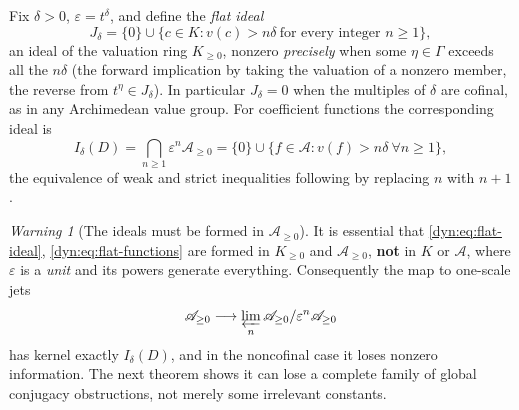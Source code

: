 \documentclass[11pt,letterpaper]{article}
\theoremstyle{definition}
\theoremstyle{remark}
\newtheorem{warning}[warning]{Warning}
\newcommand{\AAA}{\mathscr A}
\newcommand{\eps}{\varepsilon}
\numberwithin{equation}{section}
\begin{document}
Fix $\delta>0$, $\eps=t^{\delta}$, and define the \emph{flat ideal}
\begin{equation}\label{dyn:eq:flat-ideal}
 J_\delta=\{0\}\cup\{c\in K:v(c)>n\delta\ \text{for every integer }n\ge1\},
\end{equation}
an ideal of the valuation ring $K_{\ge0}$, nonzero \emph{precisely} when
some $\eta\in\Gamma$ exceeds all the $n\delta$ (the forward implication by
taking the valuation of a nonzero member, the reverse from
$t^{\eta}\in J_\delta$). In particular $J_\delta=0$ when the multiples of
$\delta$ are cofinal, as in any Archimedean value group. For coefficient
functions the corresponding ideal is
\begin{equation}\label{dyn:eq:flat-functions}
 I_\delta(D)=\bigcap_{n\ge1}\eps^{n}\AAA_{\ge0}
 =\{0\}\cup\{f\in\AAA:v(f)>n\delta\ \forall n\ge1\},
\end{equation}
the equivalence of weak and strict inequalities following by replacing $n$
with $n+1$.

\begin{warning}[The ideals must be formed in $\AAA_{\ge0}$]
\label{dyn:warn:flatideal}
It is essential that \eqref{dyn:eq:flat-ideal},
\eqref{dyn:eq:flat-functions} are formed in $K_{\ge0}$ and
$\AAA_{\ge0}$, \textbf{not} in $K$ or $\AAA$, where $\eps$ is a
\emph{unit} and its powers generate everything. Consequently the map to
one-scale jets
\begin{equation}\label{dyn:eq:jet-map}
 \AAA_{\ge0}\longrightarrow
 \varprojlim_n\AAA_{\ge0}/\eps^{n}\AAA_{\ge0}
\end{equation}
has kernel exactly $I_\delta(D)$, and in the noncofinal case it loses
nonzero information. The next theorem shows it can lose a complete family
of global conjugacy obstructions, not merely some irrelevant constants.
\end{warning}
\end{document}
